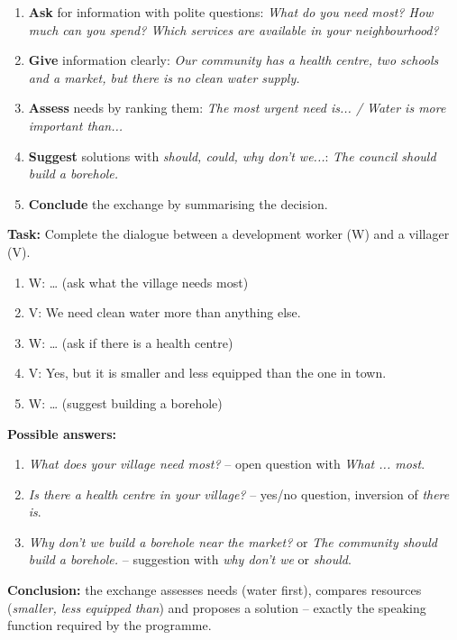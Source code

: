 \documentclass[11pt]{article}
\begin{document}
\begin{methode}
\begin{enumerate}
\item \textbf{Ask} for information with polite questions: \emph{What do you need most? How much can you spend? Which services are available in your neighbourhood?}
\item \textbf{Give} information clearly: \emph{Our community has a health centre, two schools and a market, but there is no clean water supply.}
\item \textbf{Assess} needs by ranking them: \emph{The most urgent need is... / Water is more important than...}
\item \textbf{Suggest} solutions with \emph{should, could, why don't we...}: \emph{The council should build a borehole.}
\item \textbf{Conclude} the exchange by summarising the decision.
\end{enumerate}
\end{methode}

\begin{exoresolu}
\textbf{Task:} Complete the dialogue between a development worker (W) and a villager (V).
\begin{enumerate}
\item W: \dots{} (ask what the village needs most)
\item V: We need clean water more than anything else.
\item W: \dots{} (ask if there is a health centre)
\item V: Yes, but it is smaller and less equipped than the one in town.
\item W: \dots{} (suggest building a borehole)
\end{enumerate}
\tcblower
\textbf{Possible answers:}
\begin{enumerate}
\item \emph{What does your village need most?} -- open question with \emph{What ... most}.
\item \emph{Is there a health centre in your village?} -- yes/no question, inversion of \emph{there is}.
\item \emph{Why don't we build a borehole near the market?} or \emph{The community should build a borehole.} -- suggestion with \emph{why don't we} or \emph{should}.
\end{enumerate}
\textbf{Conclusion:} the exchange assesses needs (water first), compares resources (\emph{smaller, less equipped than}) and proposes a solution -- exactly the speaking function required by the programme.
\end{exoresolu}
\end{document}
